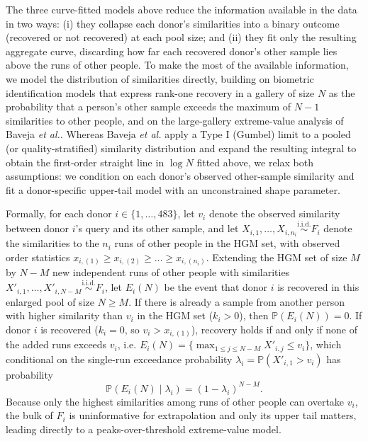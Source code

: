 \documentclass[11pt,a4paper]{article}
\begin{document}
The three curve-fitted models above reduce the information available in the data in two ways: (i) they collapse each donor's similarities into a binary outcome (recovered or not recovered) at each pool size; and (ii) they fit only the resulting aggregate curve, discarding how far each recovered donor's other sample lies above the runs of other people. To make the most of the available information, we model the distribution of similarities directly, building on biometric identification models that express rank-one recovery in a gallery of size $N$ as the probability that a person's other sample exceeds the maximum of $N - 1$ similarities to other people\cite{grother2004,bolle2005}, and on the large-gallery extreme-value analysis of Baveja \textit{et al.}\cite{baveja2010}. Whereas Baveja \textit{et al.} apply a Type I (Gumbel) limit to a pooled (or quality-stratified) similarity distribution and expand the resulting integral to obtain the first-order straight line in $\log N$ fitted above, we relax both assumptions: we condition on each donor's observed other-sample similarity and fit a donor-specific upper-tail model with an unconstrained shape parameter.

Formally, for each donor $i \in \{1, \dots, 483\}$, let $v_i$ denote the observed similarity between donor $i$'s query and its other sample, and let $X_{i,1}, \dots, X_{i,n_i} \stackrel{\mathrm{i.i.d.}}{\sim} F_i$ denote the similarities to the $n_i$ runs of other people in the HGM set, with observed order statistics $x_{i,(1)} \ge x_{i,(2)} \ge \dots \ge x_{i,(n_i)}$. Extending the HGM set of size $M$ by $N - M$ new independent runs of other people with similarities $X'_{i,1}, \dots, X'_{i,N-M} \stackrel{\mathrm{i.i.d.}}{\sim} F_i$, let $E_i(N)$ be the event that donor $i$ is recovered in this enlarged pool of size $N \ge M$. If there is already a sample from another person with higher similarity than $v_i$ in the HGM set ($k_i > 0$), then $\mathbb{P}(E_i(N)) = 0$. If donor $i$ is recovered ($k_i = 0$, so $v_i > x_{i,(1)}$), recovery holds if and only if none of the added runs exceeds $v_i$, i.e. $E_i(N) = \{\max_{1 \le j \le N - M} X'_{i,j} \le v_i\}$, which conditional on the single-run exceedance probability $\lambda_i = \mathbb{P}(X'_{i,1} > v_i)$ has probability
\[
    \mathbb{P}\!\left(E_i(N) \mid \lambda_i\right) = (1 - \lambda_i)^{N - M}.
\]
Because only the highest similarities among runs of other people can overtake $v_i$, the bulk of $F_i$ is uninformative for extrapolation and only its upper tail matters, leading directly to a peaks-over-threshold extreme-value model.
\end{document}
